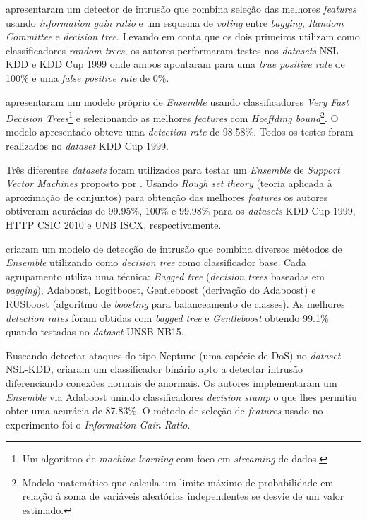 apresentaram um detector de intrusão que combina seleção das melhores \textit{features} usando \textit{information gain ratio} e um esquema de \textit{voting} entre \textit{bagging}, \textit{Random Committee} e \textit{decision tree}. Levando em conta que os dois primeiros utilizam como classificadores \textit{random trees}, os autores performaram testes nos \textit{datasets} NSL-KDD e KDD Cup 1999 onde ambos apontaram para uma \textit{true positive rate} de 100\% e uma \textit{false positive rate} de 0\%.

 apresentaram um modelo próprio de \textit{Ensemble} usando classificadores \textit{Very Fast Decision Trees}\footnote{Um algoritmo de \textit{machine learning} com foco em \textit{streaming} de dados.} e selecionando as melhores \textit{features} com \textit{Hoeffding bound}\footnote{Modelo matemático que calcula um limite máximo de probabilidade em relação à soma de variáveis aleatórias independentes se desvie de um valor estimado.}. O modelo apresentado obteve uma \textit{detection rate} de 98.58\%. Todos os testes foram realizados no \textit{dataset} KDD Cup 1999.

Três diferentes \textit{datasets} foram utilizados para testar um \textit{Ensemble} de \textit{Support Vector Machines} proposto por . Usando \textit{Rough set theory} (teoria aplicada à aproximação de conjuntos) para obtenção das melhores \textit{features} os autores obtiveram acurácias de 99.95\%, 100\% e 99.98\% para os \textit{datasets} KDD Cup 1999, HTTP CSIC 2010 e UNB ISCX, respectivamente.

 criaram um modelo de detecção de intrusão que combina diversos métodos de \textit{Ensemble} utilizando como \textit{decision tree} como classificador base. Cada agrupamento utiliza uma técnica: \textit{Bagged tree} (\textit{decision trees} baseadas em \textit{bagging}), Adaboost, Logitboost, Gentleboost (derivação do Adaboost) e RUSboost (algoritmo de \textit{boosting} para balanceamento de classes). As melhores \textit{detection rates} foram obtidas com \textit{bagged tree} e \textit{Gentleboost} obtendo 99.1\% quando testadas no \textit{dataset} UNSB-NB15.


Buscando detectar ataques do tipo Neptune (uma espécie de DoS) no \textit{dataset} NSL-KDD,  criaram um classificador binário apto a detectar intrusão diferenciando conexões normais de anormais. Os autores implementaram um \textit{Ensemble} via Adaboost unindo classificadores \textit{decision stump} o que lhes permitiu obter uma acurácia de 87.83\%. O método de seleção de \textit{features} usado no experimento foi o \textit{Information Gain Ratio}.

